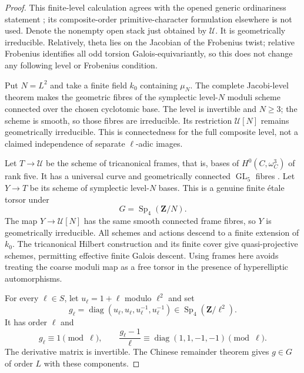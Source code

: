 \begin{proof}
This finite-level calculation agrees with the opened
generic ordinariness statement
\citep[Proposition 1.3]{A_Yang2016}; its composite-order
primitive-character formulation elsewhere is not used.
Denote the nonempty open stack just obtained by $\mathcal U$.
It is geometrically irreducible. Relatively, theta lies on
the Jacobian of the Frobenius twist; relative Frobenius
identifies all odd torsion Galois-equivariantly, so this
does not change any following level or Frobenius condition.

Put $N=L^2$ and take a finite field $k_0$ containing $\mu_N$.
The complete Jacobi-level theorem
\citep[Theorem 5.15, pp.108--109]{A_DeligneMumford1969}
makes the geometric fibres of the symplectic level-$N$
moduli scheme connected over the chosen cyclotomic base.
The level is invertible and $N\ge3$; the scheme is smooth,
so those fibres are irreducible. Its restriction
$\mathcal U[N]$ remains geometrically irreducible.
This is connectedness for the full composite level,
not a claimed independence of separate $\ell$-adic images.

Let $T\to\mathcal U$ be the scheme of tricanonical frames,
that is, bases of $H^0(C,\omega_C^3)$ of rank five.
It has a universal curve and geometrically connected
$\operatorname{GL}_5$ fibres
\citep[\S5.1 and Lemma 5.2]{A_AchterPries2008}.
Let $Y\to T$ be its scheme of symplectic level-$N$ bases.
This is a genuine finite \'etale torsor under
\[
                             G=\operatorname{Sp}_4(\mathbf Z/N).
\]
The map $Y\to\mathcal U[N]$ has the same smooth connected
frame fibres, so $Y$ is geometrically irreducible.
All schemes and actions descend to a finite extension
of $k_0$. The tricanonical Hilbert construction and its
finite cover give quasi-projective schemes, permitting
effective finite Galois descent. Using frames here avoids
treating the coarse moduli map as a free torsor in the
presence of hyperelliptic automorphisms.

For every $\ell\in S$, let $u_\ell=1+\ell$ modulo $\ell^2$ and set
\[
 g_\ell=\operatorname{diag}
    (u_\ell,u_\ell,u_\ell^{-1},u_\ell^{-1})
       \in\operatorname{Sp}_4(\mathbf Z/\ell^2).
\]
It has order $\ell$ and
\[
 g_\ell\equiv1\pmod\ell,\qquad
 \frac{g_\ell-1}{\ell}\equiv
               \operatorname{diag}(1,1,-1,-1)\pmod\ell .
\]
The derivative matrix is invertible. The Chinese remainder
theorem gives $g\in G$ of order $L$ with these components.


\end{proof}
